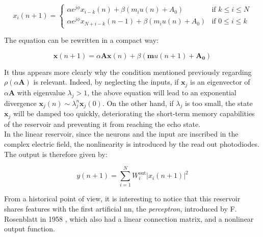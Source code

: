 \begin{equation}
	x_i(n+1) = 
	\begin{cases}
		\alpha e^{j\phi} x_{i-k}(n)+\beta \left(m_i u(n) +A_0 \right) & \text{if } k \leq i \leq N\\
		\alpha e^{j\phi} x_{N+i-k}(n-1)+\beta \left(m_i u(n) +A_0 \right) & \text{if } 0 \leq i \leq k			
	\end{cases}
	\label{rc_lin_dynamics}
\end{equation}

The equation can be rewritten in a compact way:

\begin{equation}
	\mathbf{x}(n+1) = \alpha \mathbf{A} \mathbf{x}(n) + \beta (\mathbf{m} u(n+1)+ \mathbf{A_0})
	\label{rc_lin_dynamics}
\end{equation}

It thus appears more clearly why the condition mentioned previously regarding $\rho \left( \alpha \mathbf{A} \right)$ is relevant. Indeed, by neglecting the inputs, if $\mathbf{x}_j$ is an eigenvector of $\alpha \mathbf{A}$ with eigenvalue $\lambda_j>1$, the above equation will lead to an exponential divergence $\mathbf{x}_j(n) \sim \lambda_j^n \mathbf{x}_j(0)$. On the other hand, if $\lambda_j$ is too small, the state $\mathbf{x}_j$ will be damped too quickly, deteriorating the short-term memory capabilities of the reservoir and preventing it from reaching the echo state. \\

In the linear reservoir, since the neurons and the input are inscribed in the complex electric field, the nonlinearity is introduced by the read out photodiodes. The output is therefore given by:

\begin{equation}
	y(n+1) = \sum_{i=1}^{N} W^{\text{out}}_i |x_i (n+1)|^2
	\label{quad_output_rc}
\end{equation}

From a historical point of view, it is interesting to notice that this reservoir shares features with the first artificial \gls{nn}, the \emph{perceptron}, introduced by F. Rosenblatt in 1958 \cite{Rosenblatt58theperceptron}, which also had a linear connection matrix, and a nonlinear output function.\\

